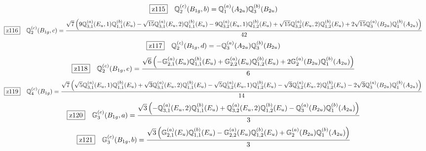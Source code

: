 \documentclass[fleqn,10pt,landscape]{jsarticle}
\begin{document}
\begin{dmath*}
\hspace*{3mm}\fbox{z115}\quad \mathbb{Q}_{2}^{(c)}(B_{1g},b)=\mathbb{Q}_{1}^{(a)}(A_{2u}) \mathbb{Q}_{3}^{(b)}(B_{2u})
\end{dmath*}
\begin{dmath*}
\hspace*{3mm}\fbox{z116}\quad \mathbb{Q}_{2}^{(c)}(B_{1g},c)=\frac{\sqrt{7} \left(9 \mathbb{Q}_{3,1}^{(a)}(E_{u},1) \mathbb{Q}_{1,1}^{(b)}(E_{u}) - \sqrt{15} \mathbb{Q}_{3,1}^{(a)}(E_{u},2) \mathbb{Q}_{1,1}^{(b)}(E_{u}) - 9 \mathbb{Q}_{3,2}^{(a)}(E_{u},1) \mathbb{Q}_{1,2}^{(b)}(E_{u}) + \sqrt{15} \mathbb{Q}_{3,2}^{(a)}(E_{u},2) \mathbb{Q}_{1,2}^{(b)}(E_{u}) + 2 \sqrt{15} \mathbb{Q}_{3}^{(a)}(B_{2u}) \mathbb{Q}_{1}^{(b)}(A_{2u})\right)}{42}
\end{dmath*}
\begin{dmath*}
\hspace*{3mm}\fbox{z117}\quad \mathbb{Q}_{2}^{(c)}(B_{1g},d)=- \mathbb{Q}_{3}^{(a)}(A_{2u}) \mathbb{Q}_{3}^{(b)}(B_{2u})
\end{dmath*}
\begin{dmath*}
\hspace*{3mm}\fbox{z118}\quad \mathbb{Q}_{2}^{(c)}(B_{1g},e)=\frac{\sqrt{6} \left(- \mathbb{G}_{2,1}^{(a)}(E_{u}) \mathbb{Q}_{1,1}^{(b)}(E_{u}) + \mathbb{G}_{2,2}^{(a)}(E_{u}) \mathbb{Q}_{1,2}^{(b)}(E_{u}) + 2 \mathbb{G}_{2}^{(a)}(B_{2u}) \mathbb{Q}_{1}^{(b)}(A_{2u})\right)}{6}
\end{dmath*}
\begin{dmath*}
\hspace*{3mm}\fbox{z119}\quad \mathbb{Q}_{4}^{(c)}(B_{1g})=\frac{\sqrt{7} \left(\sqrt{5} \mathbb{Q}_{3,1}^{(a)}(E_{u},1) \mathbb{Q}_{1,1}^{(b)}(E_{u}) + \sqrt{3} \mathbb{Q}_{3,1}^{(a)}(E_{u},2) \mathbb{Q}_{1,1}^{(b)}(E_{u}) - \sqrt{5} \mathbb{Q}_{3,2}^{(a)}(E_{u},1) \mathbb{Q}_{1,2}^{(b)}(E_{u}) - \sqrt{3} \mathbb{Q}_{3,2}^{(a)}(E_{u},2) \mathbb{Q}_{1,2}^{(b)}(E_{u}) - 2 \sqrt{3} \mathbb{Q}_{3}^{(a)}(B_{2u}) \mathbb{Q}_{1}^{(b)}(A_{2u})\right)}{14}
\end{dmath*}
\begin{dmath*}
\hspace*{3mm}\fbox{z120}\quad \mathbb{G}_{3}^{(c)}(B_{1g},a)=\frac{\sqrt{3} \left(- \mathbb{Q}_{3,1}^{(a)}(E_{u},2) \mathbb{Q}_{1,1}^{(b)}(E_{u}) + \mathbb{Q}_{3,2}^{(a)}(E_{u},2) \mathbb{Q}_{1,2}^{(b)}(E_{u}) - \mathbb{Q}_{3}^{(a)}(B_{2u}) \mathbb{Q}_{1}^{(b)}(A_{2u})\right)}{3}
\end{dmath*}
\begin{dmath*}
\hspace*{3mm}\fbox{z121}\quad \mathbb{G}_{3}^{(c)}(B_{1g},b)=\frac{\sqrt{3} \left(\mathbb{G}_{2,1}^{(a)}(E_{u}) \mathbb{Q}_{1,1}^{(b)}(E_{u}) - \mathbb{G}_{2,2}^{(a)}(E_{u}) \mathbb{Q}_{1,2}^{(b)}(E_{u}) + \mathbb{G}_{2}^{(a)}(B_{2u}) \mathbb{Q}_{1}^{(b)}(A_{2u})\right)}{3}
\end{dmath*}
\end{document}
